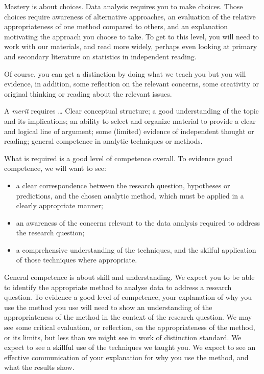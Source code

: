 \documentclass[
  letterpaper,
  DIV=11,
  numbers=noendperiod]{scrreprt}
\providecommand{\tightlist}{%
  \setlength{\itemsep}{0pt}\setlength{\parskip}{0pt}}\usepackage{longtable,booktabs,array}
\begin{document}
Mastery is about choices. Data analysis requires you to make choices.
Those choices require awareness of alternative approaches, an evaluation
of the relative appropriateness of one method compared to others, and an
explanation motivating the approach you choose to take. To get to this
level, you will need to work with our materials, and read more widely,
perhaps even looking at primary and secondary literature on statistics
in independent reading.

Of course, you can get a distinction by doing what we teach you but you
will evidence, in addition, some reflection on the relevant concerns,
some creativity or original thinking or reading about the relevant
issues.

A \emph{merit} requires \ldots{} Clear conceptual structure; a good
understanding of the topic and its implications; an ability to select
and organize material to provide a clear and logical line of argument;
some (limited) evidence of independent thought or reading; general
competence in analytic techniques or methods.

What is required is a good level of competence overall. To evidence good
competence, we will want to see:

\begin{itemize}
\tightlist
\item
  a clear correspondence between the research question, hypotheses or
  predictions, and the chosen analytic method, which must be applied in
  a clearly appropriate manner;
\item
  an awareness of the concerns relevant to the data analysis required to
  address the research question;
\item
  a comprehensive understanding of the techniques, and the skilful
  application of those techniques where appropriate.
\end{itemize}

General competence is about skill and understanding. We expect you to be
able to identify the appropriate method to analyse data to address a
research question. To evidence a good level of competence, your
explanation of why you use the method you use will need to show an
understanding of the appropriateness of the method in the context of the
research question. We may see some critical evaluation, or reflection,
on the appropriateness of the method, or its limits, but less than we
might see in work of distinction standard. We expect to see a skillful
use of the techniques we taught you. We expect to see an effective
communication of your explanation for why you use the method, and what
the results show.
\end{document}
